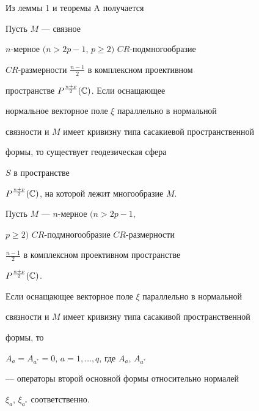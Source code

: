 Из леммы 1 и теоремы A получается








\begin{thm}


Пусть $M$ --- связное


$n$-мерное $(n>2p-1$, $p\ge 2)$ $CR$-под\-мно\-го\-об\-разие


$CR$-размерности $\frac{n-1}{2}$ в комплексном проективном


пространстве $P^{\frac{n+p}{2}}(\Bbb C)$. Если оснащающее


нормальное векторное поле $\xi$ параллельно в нормальной


связности и $M$ имеет кривизну типа сасакиевой пространственной


формы, то существует геодезическая сфера


$S$ в пространстве


$P^{\frac{n+p}{2}}(\Bbb C)$, на которой лежит многообразие  $M$.


\end{thm}








\begin{lem}


Пусть $M$ --- $n$-мерное $(n>2p-1$,


$p\ge 2)$ $CR$-подмногообразие $CR$-размерности


$\frac{n-1}{2}$ в комплексном проективном пространстве


$P^{\frac{n+p}{2}}(\Bbb C)$.


Если оснащающее векторное поле $\xi$ параллельно в нормальной


связности и  $M$ имеет кривизну типа сасакивой пространственной


формы, то


$A_a=A_{a^*}=0$, $a=1,\dotsc,q$, где $A_a$, $A_{a^*}$


--- операторы второй основной формы относительно нормалей


$\xi_a$, $\xi_{a^*}$ соответственно. 


\end{lem}








